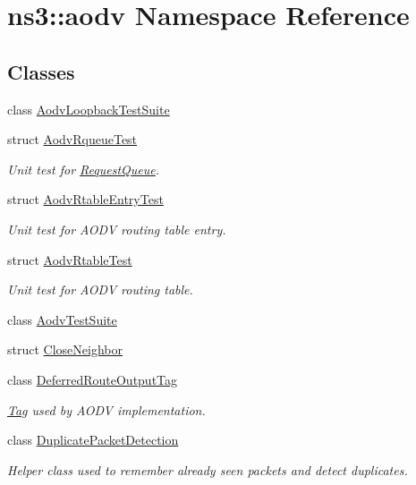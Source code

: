 \hypertarget{namespacens3_1_1aodv}{}\section{ns3\+:\+:aodv Namespace Reference}
\label{namespacens3_1_1aodv}
\subsection*{Classes}
\begin{DoxyCompactItemize}
\item 
class \hyperlink{classns3_1_1aodv_1_1AodvLoopbackTestSuite}{Aodv\+Loopback\+Test\+Suite}
\item 
struct \hyperlink{structns3_1_1aodv_1_1AodvRqueueTest}{Aodv\+Rqueue\+Test}
\begin{DoxyCompactList}\small\item\em Unit test for \hyperlink{classns3_1_1aodv_1_1RequestQueue}{Request\+Queue}. \end{DoxyCompactList}\item 
struct \hyperlink{structns3_1_1aodv_1_1AodvRtableEntryTest}{Aodv\+Rtable\+Entry\+Test}
\begin{DoxyCompactList}\small\item\em Unit test for A\+O\+DV routing table entry. \end{DoxyCompactList}\item 
struct \hyperlink{structns3_1_1aodv_1_1AodvRtableTest}{Aodv\+Rtable\+Test}
\begin{DoxyCompactList}\small\item\em Unit test for A\+O\+DV routing table. \end{DoxyCompactList}\item 
class \hyperlink{classns3_1_1aodv_1_1AodvTestSuite}{Aodv\+Test\+Suite}
\item 
struct \hyperlink{structns3_1_1aodv_1_1CloseNeighbor}{Close\+Neighbor}
\item 
class \hyperlink{classns3_1_1aodv_1_1DeferredRouteOutputTag}{Deferred\+Route\+Output\+Tag}
\begin{DoxyCompactList}\small\item\em \hyperlink{classns3_1_1Tag}{Tag} used by A\+O\+DV implementation. \end{DoxyCompactList}\item 
class \hyperlink{classns3_1_1aodv_1_1DuplicatePacketDetection}{Duplicate\+Packet\+Detection}
\begin{DoxyCompactList}\small\item\em Helper class used to remember already seen packets and detect duplicates. \end{DoxyCompactList}\item 

\end{DoxyCompactItemize}
